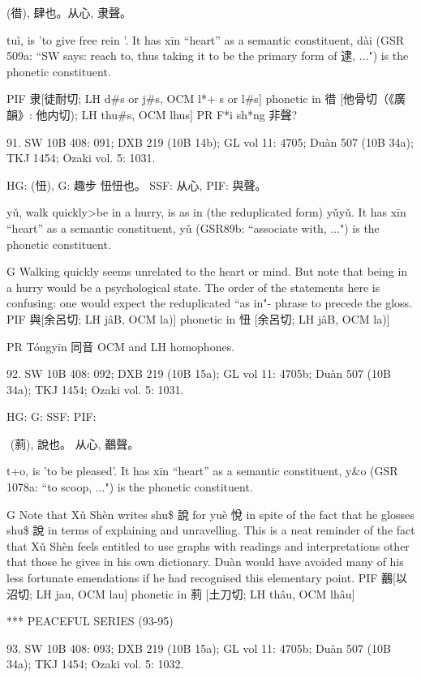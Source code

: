 (徣),
肆也。从心, 隶聲。

tuì,
is 'to give free rein '.
It has xīn ``heart'' as a semantic constituent,
dài (GSR 509a: ``SW says: reach to, thus taking it to be the primary form of 逮, ...") is the phonetic constituent.

PIF     隶[徒耐切; LH d\#s or j\#s, OCM l*+ s or l\#s] phonetic in 徣 [他骨切（《廣韻》: 他内切); LH thu\#s, OCM lhus]
PR	F*i sh*ng 非聲?

91. SW 10B 408: 091; DXB 219 (10B 14b); GL vol 11: 4705; Duàn 507 (10B 34a); TKJ 1454; Ozaki vol. 5: 1031.


HG:	(忸),
G:	趣步
忸忸也。
SSF: 从心,
PIF: 與聲。

yǔ,
walk quickly>be in a hurry,
is as in (the reduplicated form) yǔyǔ.
It has xīn ``heart'' as a semantic constituent,
yǔ (GSR89b: ``associate with, ...") is the phonetic constituent.

G	Walking quickly seems unrelated to the heart or mind. But note that being in a hurry would be a psychological state.
    The order of the statements here is confusing: one would expect the reduplicated ``as in"- phrase to precede the gloss.
PIF     與[余呂切; LH jâB, OCM la)] phonetic in 忸 [余呂切; LH jâB, OCM la)]



PR	Tóngyīn 同音 OCM and LH homophones.

92. SW 10B 408: 092; DXB 219 (10B 15a); GL vol 11: 4705b; Duàn 507 (10B 34a); TKJ 1454; Ozaki vol. 5: 1031.


HG:
G: SSF: PIF:

 (䓭), 說也。 从心,
䴊聲。


t+o,
is 'to be pleased'.
It has xīn ``heart'' as a semantic constituent,
y&o (GSR 1078a: ``to scoop, ...") is the phonetic constituent.

G Note that Xǔ Shèn writes shu\$ 說 for yuè 悅 in spite of the fact that he glosses shu\$ 說 in terms of explaining and unravelling. This is a neat reminder of the fact that Xǔ Shèn feels entitled to use graphs with readings and interpretations other that those he gives in his own dictionary. Duàn would have avoided many of his less fortunate emendations if he had recognised this elementary point.
PIF    䴊[以沼切; LH jau, OCM lau] phonetic in 䓭 [土刀切; LH thâu, OCM lhâu]

          *** PEACEFUL SERIES (93-95)

93. SW 10B 408: 093; DXB 219 (10B 15a); GL vol 11: 4705b; Duàn 507 (10B 34a); TKJ 1454; Ozaki vol. 5: 1032.


